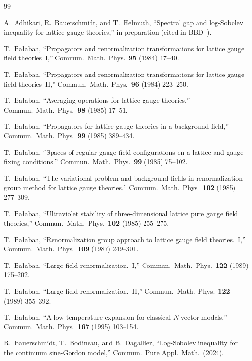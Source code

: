 \documentclass[11pt,a4paper]{article}
\theoremstyle{plain}
\theoremstyle{definition}
\theoremstyle{remark}
\begin{document}
\begin{thebibliography}{99}

 A.~Adhikari, R.~Bauerschmidt, and
  T.~Helmuth, ``Spectral gap and log-Sobolev inequality
  for lattice gauge theories,'' in preparation (cited
  in BBD~\cite{BBD24}).

 T.~Ba{\l}aban, ``Propagators and
  renormalization transformations for lattice gauge
  field theories~I,''
  Commun.\ Math.\ Phys.\ \textbf{95} (1984) 17--40.

 T.~Ba{\l}aban, ``Propagators and
  renormalization transformations for lattice gauge
  field theories~II,''
  Commun.\ Math.\ Phys.\ \textbf{96} (1984) 223--250.

 T.~Ba{\l}aban, ``Averaging operations
  for lattice gauge theories,''
  Commun.\ Math.\ Phys.\ \textbf{98} (1985) 17--51.

 T.~Ba{\l}aban, ``Propagators for
  lattice gauge theories in a background field,''
  Commun.\ Math.\ Phys.\ \textbf{99} (1985) 389--434.

 T.~Ba{\l}aban, ``Spaces of regular
  gauge field configurations on a lattice and gauge
  fixing conditions,''
  Commun.\ Math.\ Phys.\ \textbf{99} (1985) 75--102.

 T.~Ba{\l}aban, ``The variational problem
  and background fields in renormalization group method
  for lattice gauge theories,''
  Commun.\ Math.\ Phys.\ \textbf{102} (1985) 277--309.

 T.~Ba{\l}aban, ``Ultraviolet stability
  of three-dimensional lattice pure gauge field theories,''
  Commun.\ Math.\ Phys.\ \textbf{102} (1985) 255--275.

 T.~Ba{\l}aban, ``Renormalization group
  approach to lattice gauge field theories.~I,''
  Commun.\ Math.\ Phys.\ \textbf{109} (1987) 249--301.

 T.~Ba{\l}aban, ``Large field
  renormalization.~I,''
  Commun.\ Math.\ Phys.\ \textbf{122} (1989) 175--202.

 T.~Ba{\l}aban, ``Large field
  renormalization.~II,''
  Commun.\ Math.\ Phys.\ \textbf{122} (1989) 355--392.

 T.~Ba{\l}aban, ``A low temperature
  expansion for classical $N$-vector models,''
  Commun.\ Math.\ Phys.\ \textbf{167} (1995) 103--154.

 R.~Bauerschmidt, T.~Bodineau, and
  B.~Dagallier, ``Log-Sobolev inequality for the
  continuum sine-Gordon model,''
  Commun.\ Pure Appl.\ Math.\ (2024).


\end{thebibliography}
\end{document}
